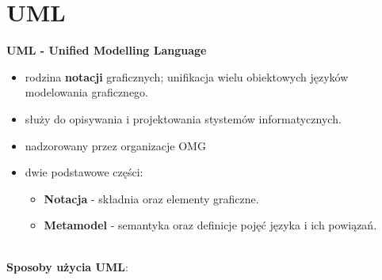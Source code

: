 \documentclass[a4paper]{article}
\begin{document}
    \section {UML}
    \textbf{UML - Unified Modelling Language}
    \begin{itemize}
        \item rodzina \textbf{notacji} graficznych; unifikacja wielu obiektowych języków modelowania graficznego.
        \item służy do opisywania i projektowania stystemów informatycznych.
        \item nadzorowany przez organizacje OMG
        \item dwie podstawowe części:
        \begin{itemize}
            \item \textbf{Notacja} - składnia oraz elementy graficzne.
            \item \textbf{Metamodel} - semantyka oraz definicje pojęć języka i ich powiązań.
        \end{itemize}
    \end{itemize}
    \hfill \\
    \textbf{Sposoby użycia UML}:
\end{document}
